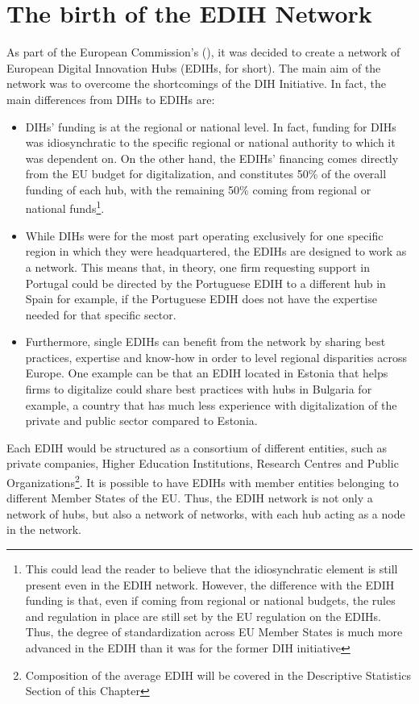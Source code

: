 \documentclass[12pt]{report}
\begin{document}
\section{The birth of the EDIH Network}

\par As part of the European Commission's  (\cite{digital_europe_programme}), it was decided to create a network of European Digital Innovation Hubs (EDIHs, for short). The main aim of the network was to overcome the shortcomings of the DIH Initiative. In fact, the main differences from DIHs to EDIHs are:
\begin{itemize}
    \item DIHs' funding is at the regional or national level. In fact, funding for DIHs was idiosynchratic to the specific regional or national authority to which it was dependent on. On the other hand, the EDIHs' financing comes directly from the EU budget for digitalization, and constitutes 50\% of the overall funding of each hub, with the remaining 50\% coming from regional or national funds\footnote{This could lead the reader to believe that the idiosynchratic element is still present even in the EDIH network. However, the difference with the EDIH funding is that, even if coming from regional or national budgets, the rules and regulation in place are still set by the EU regulation on the EDIHs. Thus, the degree of standardization across EU Member States is much more advanced in the EDIH than it was for the former DIH initiative}.
    \item While DIHs were for the most part operating exclusively for one specific region in which they were headquartered, the EDIHs are designed to work as a network. This means that, in theory, one firm requesting support in Portugal could be directed by the Portuguese EDIH to a different hub in Spain for example, if the Portuguese EDIH does not have the expertise needed for that specific sector.
    \item Furthermore, single EDIHs can benefit from the network by sharing best practices, expertise and know-how in order to level regional disparities across Europe. One example can be that an EDIH located in Estonia that helps firms to digitalize could share best practices with hubs in Bulgaria for example, a country that has much less experience with digitalization of the private and public sector compared to Estonia.
\end{itemize}

\par Each EDIH would be structured as a consortium of different entities, such as private companies, Higher Education Institutions, Research Centres and Public Organizations\footnote{Composition of the average EDIH will be covered in the Descriptive Statistics Section of this Chapter}. It is possible to have EDIHs with member entities belonging to different Member States of the EU. Thus, the EDIH network is not only a network of hubs, but also a network of networks, with each hub acting as a node in the network.
\end{document}
